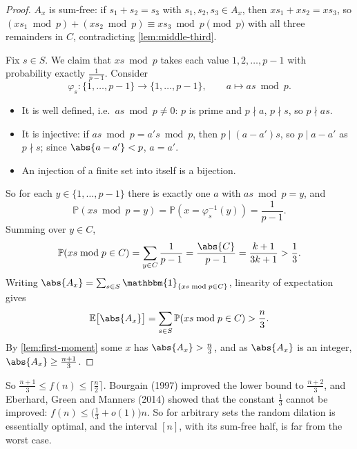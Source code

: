 \begin{proof}
    \(A_x\) is sum-free: if \(s_1 + s_2 = s_3\) with \(s_1, s_2, s_3 \in A_x\), then \(x s_1 + x s_2 = x s_3\), so \((x s_1 \bmod p) + (x s_2 \bmod p) \equiv x s_3 \bmod p \pmod p\) with all three remainders in \(C\), contradicting \autoref{lem:middle-third}.

    Fix \(s \in S\). We claim that \(xs \bmod p\) takes each value \(1, 2, \ldots, p-1\) with probability exactly \(\frac{1}{p-1}\). Consider
    \[
        \varphi_s \colon \{1, \ldots, p-1\} \to \{1, \ldots, p-1\}, \qquad a \mapsto as \bmod p.
    \]
    \begin{itemize}
        \item It is well defined, i.e.\ \(as \bmod p \ne 0\): \(p\) is prime and \(p \nmid a\), \(p \nmid s\), so \(p \nmid as\).
        \item It is injective: if \(as \bmod p = a's \bmod p\), then \(p \mid (a - a')s\), so \(p \mid a - a'\) as \(p \nmid s\); since \(\abs{a - a'} < p\), \(a = a'\).
        \item An injection of a finite set into itself is a bijection.
    \end{itemize}
    So for each \(y \in \{1, \ldots, p-1\}\) there is exactly one \(a\) with \(as \bmod p = y\), and
    \[
        \mathbb{P}(xs \bmod p = y) = \mathbb{P}(x = \varphi_s^{-1}(y)) = \frac{1}{p-1}.
    \]
    Summing over \(y \in C\),
    \[
        \mathbb{P}(xs \bmod p \in C) = \sum_{y \in C} \frac{1}{p-1} = \frac{\abs{C}}{p-1} = \frac{k+1}{3k+1} > \frac{1}{3}.
    \]
    Writing \(\abs{A_x} = \sum_{s \in S} \mathbbm{1}_{\{xs \bmod p \in C\}}\), linearity of expectation gives
    \[
        \mathbb{E}\bigl[ \abs{A_x} \bigr] = \sum_{s \in S} \mathbb{P}(xs \bmod p \in C) > \frac{n}{3}.
    \]
    By \autoref{lem:first-moment} some \(x\) has \(\abs{A_x} > \frac{n}{3}\), and as \(\abs{A_x}\) is an integer, \(\abs{A_x} \ge \frac{n+1}{3}\).
\end{proof}

\begin{remark}
    So \(\frac{n+1}{3} \le f(n) \le \lceil \frac{n}{2} \rceil\). Bourgain (1997) improved the lower bound to \(\frac{n+2}{3}\), and Eberhard, Green and Manners (2014) showed that the constant \(\frac{1}{3}\) cannot be improved: \(f(n) \le \bigl( \frac{1}{3} + o(1) \bigr) n\). So for arbitrary sets the random dilation is essentially optimal, and the interval \([n]\), with its sum-free half, is far from the worst case.
\end{remark}
